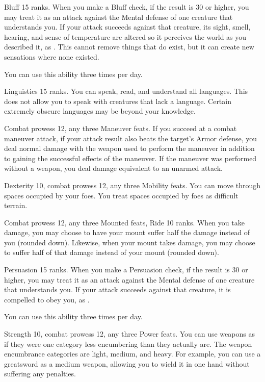 \featpre Bluff 15 ranks.
\featben When you make a Bluff check, if the result is 30 or higher, you may treat it as an attack against the Mental defense of one creature that understands you.
If your attack succeeds against that creature, its sight, smell, hearing, and sense of temperature are altered so it perceives the world as you described it, as .
This cannot remove things that do exist, but it can create new sensations where none existed.

You can use this ability three times per day.

\featpre Linguistics 15 ranks.
\featben You can speak, read, and understand all languages.
This does not allow you to speak with creatures that lack a language.
Certain extremely obscure languages may be beyond your knowledge.

\featpres Combat prowess 12, any three Maneuver feats.
\featben If you succeed at a combat maneuver attack, if your attack result also beats the target's Armor defense, you deal normal damage with the weapon used to perform the maneuver in addition to gaining the successful effects of the maneuver.
If the maneuver was performed without a weapon, you deal damage equivalent to an unarmed attack.

\featpres Dexterity 10, combat prowess 12, any three Mobility feats.
\featben You can move through spaces occupied by your foes.
You treat spaces occupied by foes as difficult terrain.

\featpres Combat prowess 12, any three Mounted feats, Ride 10 ranks.
\featben When you take damage, you may choose to have your mount suffer half the damage instead of you (rounded down).
Likewise, when your mount takes damage, you may choose to suffer half of that damage instead of your mount (rounded down).

\featpre Persuasion 15 ranks.
\featben When you make a Persuasion check, if the result is 30 or higher, you may treat it as an attack against the Mental defense of one creature that understands you.
If your attack succeeds against that creature, it is compelled to obey you, as .

You can use this ability three times per day.

\featpres Strength 10, combat prowess 12, any three Power feats.
\featben You can use weapons as if they were one category less encumbering than they actually are.
The weapon encumbrance categories are light, medium, and heavy.
For example, you can use a greatsword as a medium weapon, allowing you to wield it in one hand without suffering any penalties.

